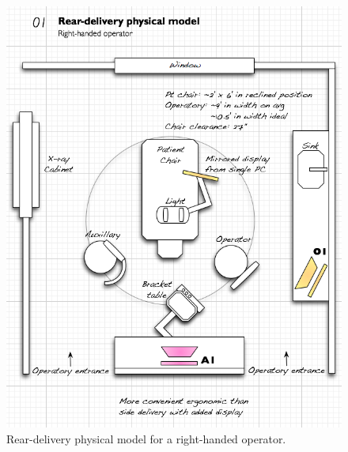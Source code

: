 \documentclass[11pt]{article}
\begin{document}
\begin{figure}[h!t]
\begin{center}
\includegraphics[width=\textwidth]{phymodel1.png}
\end{center}
\caption{Rear-delivery physical model for a right-handed operator.}
\end{figure}
\end{document}
